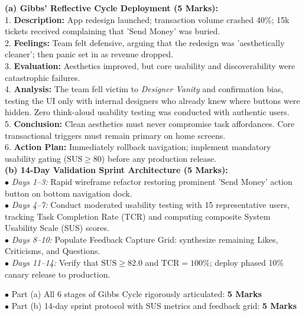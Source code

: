 \begin{solutionbox}
\textbf{(a) Gibbs' Reflective Cycle Deployment (5 Marks):}\\
1. \textbf{Description:} App redesign launched; transaction volume crashed 40\%; 15k tickets received complaining that 'Send Money' was buried.\\
2. \textbf{Feelings:} Team felt defensive, arguing that the redesign was 'aesthetically cleaner'; then panic set in as revenue dropped.\\
3. \textbf{Evaluation:} Aesthetics improved, but core usability and discoverability were catastrophic failures.\\
4. \textbf{Analysis:} The team fell victim to \textit{Designer Vanity} and confirmation bias, testing the UI only with internal designers who already knew where buttons were hidden. Zero think-aloud usability testing was conducted with authentic users.\\
5. \textbf{Conclusion:} Clean aesthetics must never compromise task affordances. Core transactional triggers must remain primary on home screens.\\
6. \textbf{Action Plan:} Immediately rollback navigation; implement mandatory usability gating ($\text{SUS} \ge 80$) before any production release.\\
\textbf{(b) 14-Day Validation Sprint Architecture (5 Marks):}\\
$\bullet$ \textit{Days 1--3:} Rapid wireframe refactor restoring prominent 'Send Money' action button on bottom navigation dock.\\
$\bullet$ \textit{Days 4--7:} Conduct moderated usability testing with 15 representative users, tracking Task Completion Rate (TCR) and computing composite System Usability Scale (SUS) scores.\\
$\bullet$ \textit{Days 8--10:} Populate Feedback Capture Grid: synthesize remaining Likes, Criticisms, and Questions.\\
$\bullet$ \textit{Days 11--14:} Verify that $\text{SUS} \ge 82.0$ and $\text{TCR} = 100\%$; deploy phased 10\% canary release to production.
\begin{markingrubric}
$\bullet$ Part (a) All 6 stages of Gibbs Cycle rigorously articulated: \textbf{5 Marks}\\
$\bullet$ Part (b) 14-day sprint protocol with SUS metrics and feedback grid: \textbf{5 Marks}
\end{markingrubric}
\end{solutionbox}

